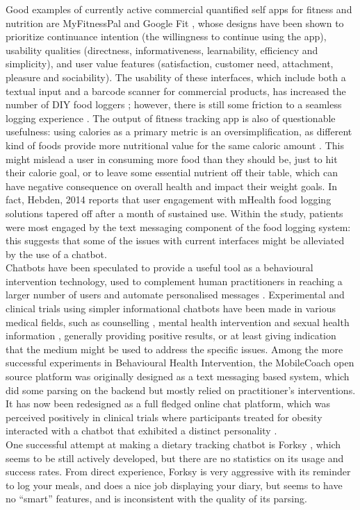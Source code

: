 Good examples of currently active commercial quantified self apps for fitness and nutrition are MyFitnessPal \cite{mfpwebsite} and Google Fit \cite{googlefitwebsite}, whose designs have been shown \cite{Suzianti2017} to prioritize continuance intention (the willingness to continue using the app), usability qualities (directness, informativeness, learnability, efficiency and simplicity), and user value features (satisfaction, customer need, attachment, pleasure and sociability). The usability of these interfaces, which include both a textual input and a barcode scanner for commercial products, has increased the number of DIY food loggers \cite{Alonso2015}; however, there is still some friction to a seamless logging experience \cite{Boushey2016}. The output of fitness tracking app is also of questionable usefulness: using calories as a primary metric is an oversimplification, as different kind of foods provide more nutritional value for the same caloric amount \cite{webmdcalories}. This might mislead a user in consuming more food than they should be, just to hit their calorie goal, or to leave some essential nutrient off their table, which can have negative consequence on overall health and impact their weight goals. In fact, Hebden, 2014 \cite{hebden2014} reports that user engagement with mHealth food logging solutions tapered off after a month of sustained use. Within the study, patients were most engaged by the text messaging component of the food logging system: this suggests that some of the issues with current interfaces might be alleviated by the use of a chatbot. \\
Chatbots have been speculated to provide a useful tool as a behavioural intervention technology, used to complement human practitioners in reaching a larger number of users and automate personalised messages \cite{Gabrielli2017}. Experimental and clinical trials using simpler informational chatbots have been made in various medical fields, such as counselling \cite{Cameron}, mental health intervention \cite{Elmasri2012} and sexual health information \cite{Brixey2017}, generally providing positive results, or at least giving indication that the medium might be used to address the specific issues.
Among the more successful experiments in Behavioural Health Intervention, the MobileCoach open source platform \cite{mobilecoacheu} was originally designed as a text messaging based system, which did some parsing on the backend but mostly relied on practitioner's interventions. It has now been redesigned as a full fledged online chat platform, which was perceived positively in clinical trials where participants treated for obesity interacted with a chatbot that exhibited a distinct personality \cite{Kowatsch2017}. \\
One successful attempt at making a dietary tracking chatbot is Forksy \cite{forksywebsite}, which seems to be still actively developed, but there are no statistics on its usage and success rates. From direct experience, Forksy is very aggressive with its reminder to log your meals, and does a nice job displaying your diary, but seems to have no ``smart'' features, and is inconsistent with the quality of its parsing.
